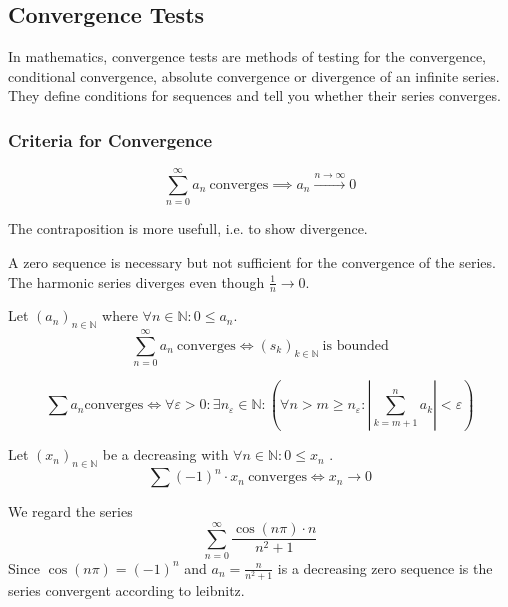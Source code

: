 \subsection{Convergence Tests}
In mathematics, convergence tests are methods of testing for the convergence, conditional convergence, absolute convergence or divergence of an infinite series.
They define conditions for sequences and tell you whether their series converges.

\subsubsection{Criteria for Convergence}
\begin{proposition}\label{pro:series_sequence_converge}
   \[\sum_{n = 0}^\infty a_n~\text{converges} \implies a_n \xrightarrow{n \to \infty} 0\]
\end{proposition}
\begin{remark}
   The contraposition is more usefull, i.e. to show divergence.
\end{remark}
\begin{remark}
   A zero sequence is necessary but not sufficient for the convergence of the series.
   The harmonic series diverges even though \(\frac{1}{n} \to 0\).
\end{remark}

\begin{theorem}\label{thm:convergence=bounded}
   Let \((a_n)_{n \in \mathbb{N}}\) where \(\forall n \in \mathbb{N}: 0 \leq a_n\).
   \[\sum_{n = 0}^\infty a_n~\text{converges} \iff (s_k)_{k \in \mathbb{N}}~\text{is bounded}\]
\end{theorem}

\begin{theorem}\label{thm:cauchy_crit_ser}
   \[\sum a_n\text{converges} \iff \forall \varepsilon > 0: \exists n_\varepsilon \in \mathbb{N}: \left(\forall n > m \geq n_\varepsilon: \left| \sum_{k = m + 1}^n a_k \right| < \varepsilon \right)\]
\end{theorem}

\begin{proposition}\label{pro:leibnitz}
   Let \((x_n)_{n \in \mathbb{N}}\) be a decreasing with \(\forall n \in \mathbb{N}: 0 \leq x_n\) .
   \[\sum (-1)^{n} \cdot x_n~\text{converges} \iff x_n \to 0\]
\end{proposition}
\begin{example}
   We regard the series
   \[\sum_{n=0}^\infty \frac{\cos(n \pi) \cdot n}{n^2 + 1}\]
   Since \(\cos(n \pi) = (-1)^n\) and \(a_n = \frac{n}{n^2 + 1}\) is a decreasing zero sequence is the series convergent according to leibnitz.
\end{example}

